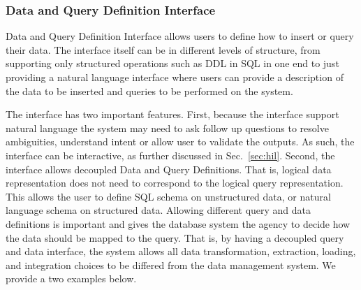 



\subsubsection{Data and Query Definition Interface}
Data and Query Definition Interface allows users to define how to insert or query their data. The interface itself can be in different levels of structure, from supporting only structured operations such as DDL in SQL in one end to just providing a natural language interface where users can provide a description of the data to be inserted and queries to be performed on the system. 

The interface has two important features. First, because the interface support natural language the system may need to ask follow up questions to resolve ambiguities, understand intent or allow user to validate the outputs. As such, the interface can be interactive, as further discussed in Sec.~\ref{sec:hil}.  Second, the interface allows decoupled Data and Query Definitions. That is, logical data representation does not need to correspond to the logical query representation. This allows the user to define SQL schema on unstructured data, or natural language schema on structured data. Allowing different query and data definitions is important and gives the database system the agency to decide how the data should be mapped to the query. That is, by having a decoupled query and data interface, the system allows all data transformation, extraction, loading, and integration choices to be differed from the data management system. We provide a two examples below. 


